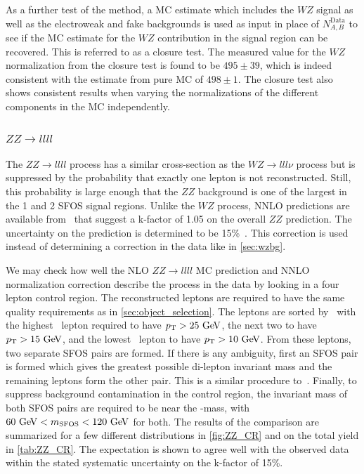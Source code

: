 As a further test of the method, a MC estimate which includes the $WZ$ signal as
well as the electroweak and fake backgrounds is used as input in place 
of $N^{\textrm{Data}}_{A,B}$ to see if the MC estimate for the $WZ$
contribution in the signal region can be recovered. This is referred to as
a closure test.  The measured value for the $WZ$ normalization from the 
closure test is found to be  $495\pm39$, which is indeed consistent with the
estimate from pure MC of $498\pm1$. The closure test also shows consistent
results when varying the normalizations of the different components 
in the MC independently.




\subsubsection{$ZZ\rightarrow llll$}
\label{sec:zzbg}

The $ZZ\rightarrow llll$ process has a similar cross-section as 
the $WZ\rightarrow lll\nu$ process but is 
suppressed by the probability that exactly one lepton is not reconstructed. 
Still, this probability is large enough that the $ZZ$ background is one of the 
largest in the 1 and 2 SFOS signal regions.  
Unlike the $WZ$ process, NNLO predictions are available 
from~\cite{Cascioli:2014yka,Baglio:2013toa,Bierweiler:2013dja}
that suggest a k-factor of 1.05 on the overall $ZZ$ prediction.
The uncertainty on the prediction is determined to be 
15\%~\cite{Cascioli:2014yka,Baglio:2013toa,Bierweiler:2013dja}.
This correction is used instead of determining a correction in the data
like in \sec\ref{sec:wzbg}.

We may check how well the NLO $ZZ\rightarrow llll$ MC prediction and 
NNLO normalization correction describe the process in the data by looking
in a four lepton control region. The reconstructed leptons are required to have
the same quality requirements as in \sec\ref{sec:object_selection}.
The leptons are sorted by \pt~with the highest \pt~lepton
required to have $\pt>25\GeV$, the next two to have
$\pt>15\GeV$, and the lowest \pt~lepton to have $\pt>10\GeV$.
From these leptons, two separate SFOS pairs are formed. If there
is any ambiguity, first an SFOS pair is formed which gives the greatest
possible di-lepton invariant mass and the remaining leptons form the other pair.
This is a similar procedure to~\cite{Aad:2014wra}. Finally, 
to suppress background contamination in the control region,
the invariant mass of both SFOS pairs are required to be near the \z-mass, 
with $60\GeV<m_{\textrm{SFOS}}<120\GeV$ for both.
The results of the comparison are summarized for a few different distributions
in \fig\ref{fig:ZZ_CR} and on the total yield in \tab\ref{tab:ZZ_CR}.
The expectation is shown to agree well with the observed data within the 
stated systematic uncertainty on the k-factor of 15\%. 


